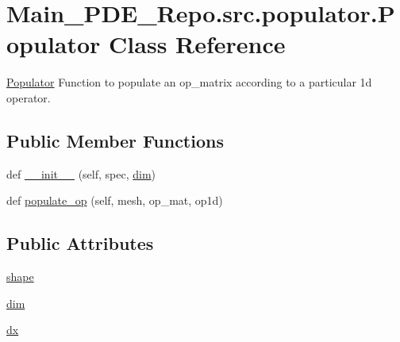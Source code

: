\hypertarget{classMain__PDE__Repo_1_1src_1_1populator_1_1Populator}{}\section{Main\+\_\+\+P\+D\+E\+\_\+\+Repo.\+src.\+populator.\+Populator Class Reference}
\label{classMain__PDE__Repo_1_1src_1_1populator_1_1Populator}


\hyperlink{classMain__PDE__Repo_1_1src_1_1populator_1_1Populator}{Populator} Function to populate an op\+\_\+matrix according to a particular 1d operator.  


\subsection*{Public Member Functions}
\begin{DoxyCompactItemize}
\item 
def \hyperlink{classMain__PDE__Repo_1_1src_1_1populator_1_1Populator_a2bf19f9a4fdf912a755f2ba62a583c8f}{\+\_\+\+\_\+init\+\_\+\+\_\+} (self, spec, \hyperlink{classMain__PDE__Repo_1_1src_1_1populator_1_1Populator_a301b505c724a5a9c3f446f2260a69469}{dim})
\item 
def \hyperlink{classMain__PDE__Repo_1_1src_1_1populator_1_1Populator_adedc630ce47f1836ea4d7321b87ff3cd}{populate\+\_\+op} (self, mesh, op\+\_\+mat, op1d)
\end{DoxyCompactItemize}
\subsection*{Public Attributes}
\begin{DoxyCompactItemize}
\item 
\hyperlink{classMain__PDE__Repo_1_1src_1_1populator_1_1Populator_af9e860df7e6784efab29a3f3677a6728}{shape}
\item 
\hyperlink{classMain__PDE__Repo_1_1src_1_1populator_1_1Populator_a301b505c724a5a9c3f446f2260a69469}{dim}
\item 
\hyperlink{classMain__PDE__Repo_1_1src_1_1populator_1_1Populator_abca46171554ca659807610d0c53c8d5d}{dx}
\end{DoxyCompactItemize}
